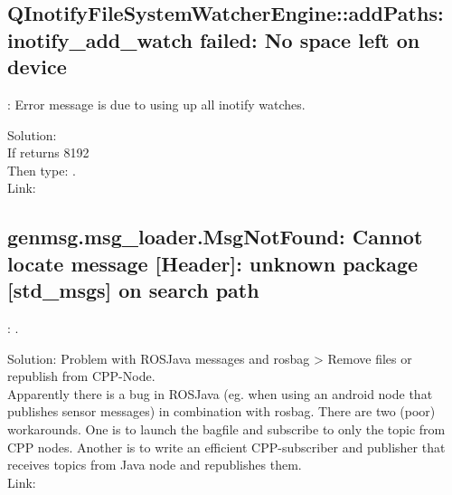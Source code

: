 

\subsection{ QInotifyFileSystemWatcherEngine::addPaths: inotify\_add\_watch failed: No space left on device }
\begin{bug}{}{}
	\caption{: Error message is due to using up all inotify watches.}
  Solution:\\
  If  returns 8192\\
  Then type: .\\
  Link: \href{https://savannah.gnu.org/bugs/?43182}{}\\
\end{bug}

\subsection{ genmsg.msg\_loader.MsgNotFound: Cannot locate message [Header]: unknown package [std\_msgs] on search path }
\begin{bug}{}{}
	\caption{: .}
  Solution: Problem with ROSJava messages and rosbag > Remove files or republish from CPP-Node.\\
  Apparently there is a bug in ROSJava (eg. when using an android node that publishes sensor messages) in combination with rosbag. There are two (poor) workarounds. One is to launch the bagfile and subscribe to only the topic from CPP nodes. Another is to write an efficient CPP-subscriber and publisher that receives topics from Java node and republishes them.\\
  Link: \href{http://answers.ros.org/question/58015/cannot-locate-message-multiarraylayout-in-python-ros-bag-api/}{}\\
\end{bug}

